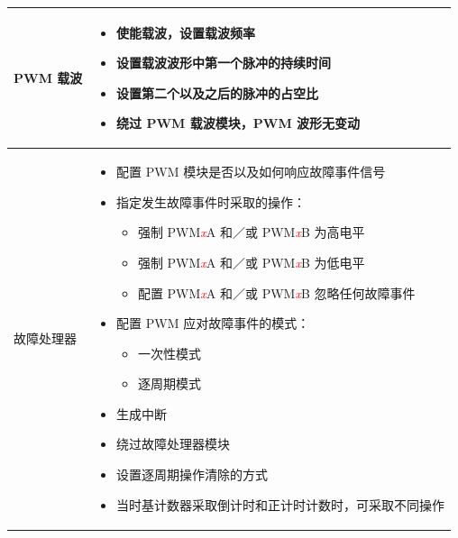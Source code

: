 \begin{longtable}[c]{|p{4cm}|p{11cm}|}
    \multirow{5}{*}{PWM 载波} &
    \vspace{-1em}\begin{itemize}
        \item 使能载波，设置载波频率
        \item 设置载波波形中第一个脉冲的持续时间
        \item 设置第二个以及之后的脉冲的占空比
        \item 绕过 PWM 载波模块，PWM 波形无变动
    \vspace{-1em}\end{itemize}\\\hline
    
    \multirow{13}{*}{故障处理器} &
    \vspace{-1em}\begin{itemize}    
        \item 配置 PWM 模块是否以及如何响应故障事件信号
        \item 
        指定发生故障事件时采取的操作：
        \begin{itemize}
            \item 强制 PWM\textcolor{red}{\it{x}}A 和／或 PWM\textcolor{red}{\it{x}}B 为高电平
            \item 强制 PWM\textcolor{red}{\it{x}}A 和／或 PWM\textcolor{red}{\it{x}}B 为低电平
            \item 配置 PWM\textcolor{red}{\it{x}}A 和／或 PWM\textcolor{red}{\it{x}}B 忽略任何故障事件
        \end{itemize}
        \item 配置 PWM 应对故障事件的模式：
        \begin{itemize}
            \item 一次性模式
            \item 逐周期模式
        \end{itemize}
        \item 生成中断
        \item 绕过故障处理器模块
        \item 设置逐周期操作清除的方式
        \item 当时基计数器采取倒计时和正计时计数时，可采取不同操作
\vspace{-1em}
    \end{itemize}\\\hline
    
\end{longtable}
